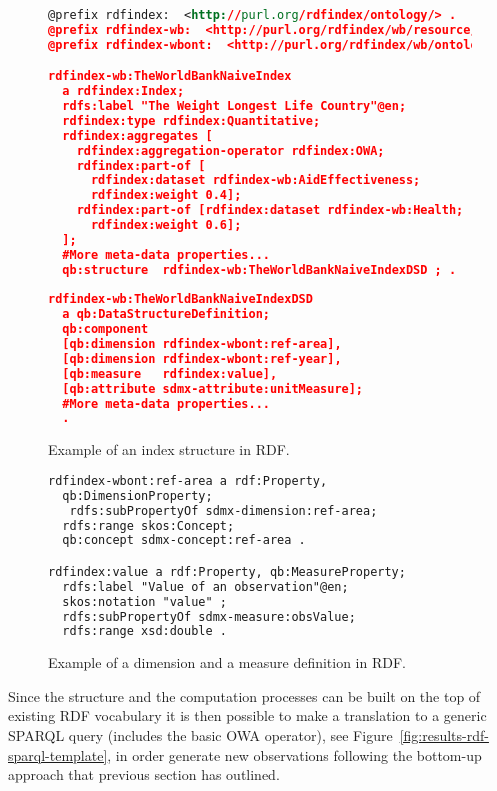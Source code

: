 \begin{figure}[!ht]
\begin{lstlisting}[language=XML,basicstyle=\scriptsize]  
@prefix rdfindex:  <http://purl.org/rdfindex/ontology/> .
@prefix rdfindex-wb:  <http://purl.org/rdfindex/wb/resource/> .
@prefix rdfindex-wbont:  <http://purl.org/rdfindex/wb/ontology/> .

rdfindex-wb:TheWorldBankNaiveIndex 
  a rdfindex:Index;
  rdfs:label "The Weight Longest Life Country"@en;
  rdfindex:type rdfindex:Quantitative;
  rdfindex:aggregates [ 		
    rdfindex:aggregation-operator rdfindex:OWA;
    rdfindex:part-of [
      rdfindex:dataset rdfindex-wb:AidEffectiveness; 
      rdfindex:weight 0.4];
    rdfindex:part-of [rdfindex:dataset rdfindex-wb:Health; 
      rdfindex:weight 0.6];
  ];
  #More meta-data properties...
  qb:structure 	rdfindex-wb:TheWorldBankNaiveIndexDSD ; .
  
rdfindex-wb:TheWorldBankNaiveIndexDSD 
  a qb:DataStructureDefinition;  
  qb:component    
  [qb:dimension rdfindex-wbont:ref-area],
  [qb:dimension rdfindex-wbont:ref-year],
  [qb:measure   rdfindex:value],
  [qb:attribute sdmx-attribute:unitMeasure];
  #More meta-data properties...
  .
\end{lstlisting}
\caption{Example of an index structure in RDF.}
 \label{fig:results-rdf-index}
\end{figure}

\begin{figure}[!ht]
\begin{lstlisting}[language=XML,basicstyle=\scriptsize]  
rdfindex-wbont:ref-area a rdf:Property, 
  qb:DimensionProperty; 
   rdfs:subPropertyOf sdmx-dimension:ref-area; 
  rdfs:range skos:Concept; 
  qb:concept sdmx-concept:ref-area . 

rdfindex:value a rdf:Property, qb:MeasureProperty;
  rdfs:label "Value of an observation"@en;
  skos:notation "value" ;
  rdfs:subPropertyOf sdmx-measure:obsValue;
  rdfs:range xsd:double . 
\end{lstlisting}
\caption{Example of a dimension and a measure definition in RDF.}
 \label{fig:results-rdf-properties}
\end{figure}


Since the structure and the computation processes can be built on the top of existing RDF vocabulary it is then 
possible to make a translation to a generic SPARQL query (includes the basic OWA operator), see Figure~\ref{fig:results-rdf-sparql-template}, 
in order generate new observations following the bottom-up approach that previous section has outlined.

